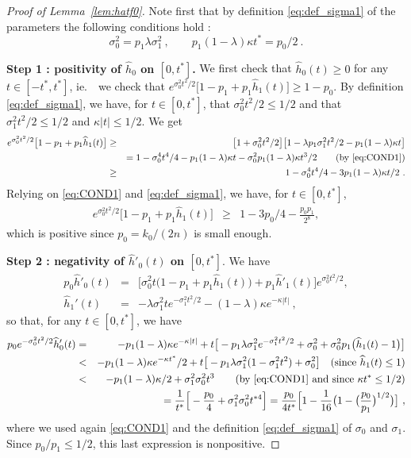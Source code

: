 \documentclass[twoside,11pt]{article}
\def\beq{\begin{equation}}
\def\eeq{\end{equation}}
\def\beqn{\begin{eqnarray*}}
\def\eeqn{\end{eqnarray*}}
\newcommand{\<}{\langle}
\renewcommand{\>}{\rangle}
\begin{document}
\begin{proof}[Proof of Lemma~\ref{lem:hatf0}]

Note first that by definition \eqref{eq:def_sigma1} of the parameters  the following conditions hold :
\beq\label{eq:COND1}
 \sigma_0^2= p_1 \lambda \sigma_1^2\ , \quad \quad 
p_1(1-\lambda) \kappa  t^*= p_0/2 \ .
\eeq



\noindent 
{\bf Step 1 : positivity of $\widehat{h}_0$ on $[0,t^*]$.} We first check that $\widehat{h}_0(t)\geq 0$ for any $t \in [-t^*, t^*]$, ie.\ ~we check that $e^{\sigma_0^2t^2 /2} \big[1 -p_1 + p_1 \widehat{h}_1(t)\big]\geq 1- p_0$. By definition \eqref{eq:def_sigma1}, we have, for $t \in [0,t^*]$, that $\sigma_0^2 t^2/2 \leq 1/2$ and that $\sigma_1^2t^2/2\leq 1/2$ and $\kappa  |t| \leq 1/2$. We get
\beqn
e^{\sigma_0^2t^2 /2} \big[1 -p_1 + p_1 \widehat{h}_1(t)\big]
&\geq& \big[ 1+  \sigma_0^2 t^2/2  \big]\big[1- \lambda p_1\sigma_1^2t^2/2 - p_1(1-\lambda) \kappa  t\big]\\
&& = 1 - \sigma_0^4t^4/4 - p_1(1-\lambda) \kappa  t - \sigma_0^2 p_1(1-\lambda) \kappa t^3/2 \quad \quad \text{(by \eqref{eq:COND1})} \\
&\geq& 1 - \sigma_0^4t^4/4 - 3p_1(1-\lambda) \kappa  t/2\ .
\eeqn 
Relying on \eqref{eq:COND1} and \eqref{eq:def_sigma1}, we have, for $t \in [0,t^*]$,
\beqn
e^{\sigma_0^2t^2 /2} \big[1 -p_1 + p_1 \widehat{h}_1(t)\big]
&\geq& 1-3p_0/4 - \frac{p_0p_1}{2^8},
\eeqn
which is positive since $p_0=k_0/(2n)$ is small enough. 



\noindent
{\bf Step 2 : negativity of $\widehat{h}'_0(t)$ on $[0,t^*]$}. We have
\beqn 
p_0 \widehat{h}'_0(t)&=&  \Big[ \sigma_0^2t  \big(1 -p_1 + p_1 \widehat{h}_1(t)\big) + p_1 \widehat{h}'_1(t)
\Big]       e^{\sigma_0^2t^2 /2}, \\
\widehat{h}_1'(t)& =&  -  \lambda \sigma_1^2 te^{-\sigma_1^2t^2/2} -  (1-\lambda) \kappa e^{-\kappa |t|}\ ,
\eeqn
so that, for any $t  \in [0,t^*]$, we have 
\beqn 
p_0      e^{-\sigma_0^2t^2 /2} \widehat{h}'_0(t)&=&  -  p_1 (1-\lambda) \kappa   e^{-\kappa|t|} + t \big[-p_1 \lambda \sigma_1^2e^{-\sigma_1^2 t^2/2}+ \sigma^2_0  + \sigma_0^2p_1 \big(\widehat{h}_1(t) -1 \big)\big]\\
&<& -  p_1 (1-\lambda) \kappa e^{-\kappa t^*} /2 + t \big[-p_1 \lambda \sigma_1^2(1-\sigma_1^2 t^2)+ \sigma^2_0 \big] \quad \text{(since $\widehat{h}_1(t)\leq 1$)}\\ 
&   < &  -  p_1 (1-\lambda) \kappa  /2 + \sigma_1^2\sigma_0^2 t^3 \quad \quad \text{(by~\eqref{eq:COND1} and since $\kappa t^*\leq 1/2$)}\\
&& = \frac{1}{t^*}\Big[-\frac{p_0}{4} + \sigma_1^2\sigma_0^2 t^{*4}\Big]   =  \frac{p_0}{4t^*}\Big[ 1- \frac{1}{16}\big(1 - \big(\frac{p_0}{p_1}\big)^{1/2}\big)\big]\ , 
\eeqn
where we used again \eqref{eq:COND1} and the definition \eqref{eq:def_sigma1} of $\sigma_0$ and $\sigma_1$. Since $p_0/p_1\leq 1/2$, this last expression is nonpositive.


\end{proof}
\end{document}
